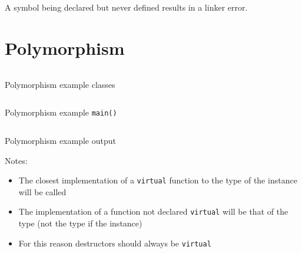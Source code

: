 \documentclass[a4paper]{article}
\begin{document}
A symbol being declared but never defined results in a linker error.

\section{Polymorphism}

\begin{listing}[h!]
  \inputminted[linenos,frame=lines,firstline=5,lastline=31]{cpp}{listings/polymorphism_1.cpp}
  \caption{Polymorphism example classes}
  \label{listing:polymorphism_1}
\end{listing}
\FloatBarrier

\begin{listing}[h!]
  \inputminted[linenos,frame=lines,firstline=33]{cpp}{listings/polymorphism_1.cpp}
  \caption{Polymorphism example \texttt{main()}}
  \label{listing:polymorphism_1_main}
\end{listing}
\FloatBarrier

\begin{listing}[h!]
  \inputminted[linenos,frame=lines]{text}{listings/polymorphism_1.txt}
  \caption{Polymorphism example output}
  \label{listing:polymorphism_1_out}
\end{listing}
\FloatBarrier

Notes:

\begin{itemize}
  \item The closest implementation of a \texttt{virtual} function to the type of
        the instance will be called
  \item The implementation of a function not declared \texttt{virtual} will be
        that of the type (not the type if the instance)
  \item For this reason destructors should always be \texttt{virtual}
\end{itemize}
\end{document}
